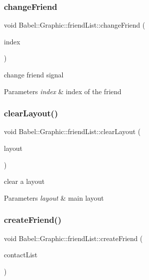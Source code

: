 \subsubsection{\texorpdfstring{change\+Friend}{changeFriend}}
{\footnotesize\ttfamily void Babel\+::\+Graphic\+::friend\+List\+::change\+Friend (\begin{DoxyParamCaption}\item[{int}]{index }\end{DoxyParamCaption})\hspace{0.3cm}{\ttfamily [signal]}}

change friend signal 
\begin{DoxyParams}{Parameters}
{\em index} & index of the friend \\
\hline
\end{DoxyParams}
\mbox{\label{classBabel_1_1Graphic_1_1friendList_ad2d71274ba22b5888a21a27b4d80db5d}} 
\subsubsection{\texorpdfstring{clear\+Layout()}{clearLayout()}}
{\footnotesize\ttfamily void Babel\+::\+Graphic\+::friend\+List\+::clear\+Layout (\begin{DoxyParamCaption}\item[{Q\+Layout $\ast$}]{layout }\end{DoxyParamCaption})}

clear a layout 
\begin{DoxyParams}{Parameters}
{\em layout} & main layout \\
\hline
\end{DoxyParams}
\mbox{\label{classBabel_1_1Graphic_1_1friendList_a1d704e7684f663c836de4444c053f0fc}} 
\subsubsection{\texorpdfstring{create\+Friend()}{createFriend()}}
{\footnotesize\ttfamily void Babel\+::\+Graphic\+::friend\+List\+::create\+Friend (\begin{DoxyParamCaption}\item[{Q\+List$<$ Q\+String $>$}]{contact\+List }\end{DoxyParamCaption})}

